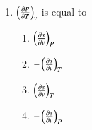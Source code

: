\documentclass[a4paper,10pt]{article}
\begin{document}
\begin{enumerate}
\begin{multicols}{4}
\begin{enumerate}
\item 0.375
\item 0.8
\item 1.25
\item 2.66
\end{enumerate}
\end{multicols}

\item $\left(\frac{\partial P}{\partial T}\right)_v$ is equal to
\hfill{}

\begin{multicols}{2}
\begin{enumerate}
\item $\left(\frac{\partial s}{\partial v}\right)_P$
\item $-\left(\frac{\partial s}{\partial v}\right)_T$
\item $\left(\frac{\partial s}{\partial v}\right)_T$
\item $-\left(\frac{\partial s}{\partial v}\right)_P$
\end{enumerate}
\end{multicols}


\end{enumerate}
\end{document}
